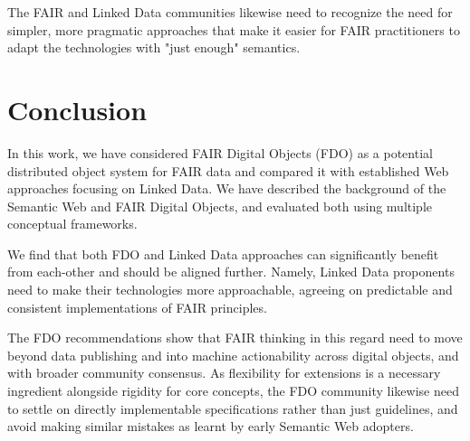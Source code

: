 \documentclass[fleqn,10pt,lineno]{wlpeerjlua}
\begin{document}
The FAIR and Linked Data communities likewise need to recognize the need for simpler, more pragmatic approaches that make it easier for FAIR practitioners to adapt the technologies with "just enough" semantics. 




\section*{Conclusion}\label{sec:conclusion}

In this work, we have considered FAIR Digital Objects (FDO) as a potential distributed object system for FAIR data and compared it with established Web approaches focusing on Linked Data. We have described the background of the Semantic Web and FAIR Digital Objects, and evaluated both using multiple conceptual frameworks.

We find that both FDO and Linked Data approaches can significantly benefit from each-other and should be aligned further. Namely, Linked Data proponents need to make their technologies more approachable, agreeing on predictable and consistent implementations of FAIR principles. 

The FDO recommendations show that FAIR thinking in this regard need to move beyond data publishing and into machine actionability across digital objects, and with broader community consensus. 
As flexibility for extensions is a necessary ingredient alongside rigidity for core concepts, the FDO community likewise need to settle on directly implementable specifications rather than just guidelines, and avoid making similar mistakes as learnt by early Semantic Web adopters. 
\end{document}
